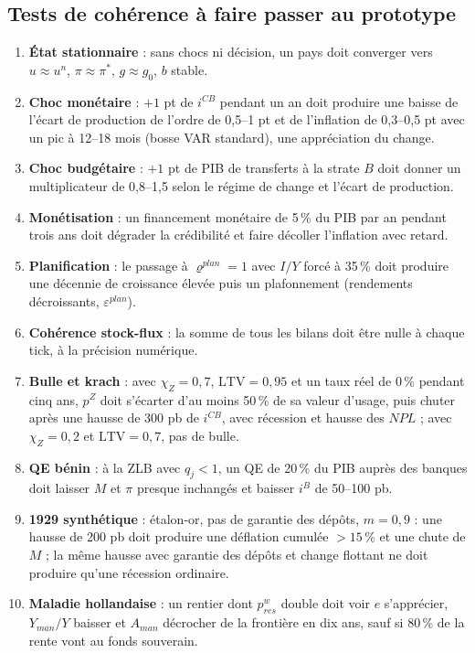 \documentclass[11pt,a4paper]{article}
\begin{document}
\subsection{Tests de cohérence à faire passer au prototype}
\label{sec:tests}
\begin{enumerate}
\item \textbf{État stationnaire} : sans chocs ni décision, un pays doit converger vers $u \approx u^n$, $\pi \approx \pi^\ast$, $g \approx g_0$, $b$ stable.
\item \textbf{Choc monétaire} : $+1$ pt de $i^{CB}$ pendant un an doit produire une baisse de l'écart de production de l'ordre de 0,5--1 pt et de l'inflation de 0,3--0,5 pt avec un pic à 12--18 mois (bosse VAR standard), une appréciation du change.
\item \textbf{Choc budgétaire} : $+1$ pt de PIB de transferts à la strate $B$ doit donner un multiplicateur de 0,8--1,5 selon le régime de change et l'écart de production.
\item \textbf{Monétisation} : un financement monétaire de 5\,\% du PIB par an pendant trois ans doit dégrader la crédibilité et faire décoller l'inflation avec retard.
\item \textbf{Planification} : le passage à $\varrho^{plan}=1$ avec $I/Y$ forcé à 35\,\% doit produire une décennie de croissance élevée puis un plafonnement (rendements décroissants, $\varepsilon^{plan}$).
\item \textbf{Cohérence stock-flux} : la somme de tous les bilans doit être nulle à chaque tick, à la précision numérique.
\item \textbf{Bulle et krach} : avec $\chi_Z = 0{,}7$, $\mathrm{LTV} = 0{,}95$ et un taux réel de 0\,\% pendant cinq ans, $p^Z$ doit s'écarter d'au moins 50\,\% de sa valeur d'usage, puis chuter après une hausse de 300 pb de $i^{CB}$, avec récession et hausse des $NPL$ ; avec $\chi_Z = 0{,}2$ et $\mathrm{LTV} = 0{,}7$, pas de bulle.
\item \textbf{QE bénin} : à la ZLB avec $q_j < 1$, un QE de 20\,\% du PIB auprès des banques doit laisser $M$ et $\pi$ presque inchangés et baisser $i^B$ de 50--100 pb.
\item \textbf{1929 synthétique} : étalon-or, pas de garantie des dépôts, $m = 0{,}9$ : une hausse de 200 pb doit produire une déflation cumulée $> 15\,\%$ et une chute de $M$ ; la même hausse avec garantie des dépôts et change flottant ne doit produire qu'une récession ordinaire.
\item \textbf{Maladie hollandaise} : un rentier dont $p^w_{res}$ double doit voir $e$ s'apprécier, $Y_{man}/Y$ baisser et $A_{man}$ décrocher de la frontière en dix ans, sauf si 80\,\% de la rente vont au fonds souverain.

\end{enumerate}
\end{document}
